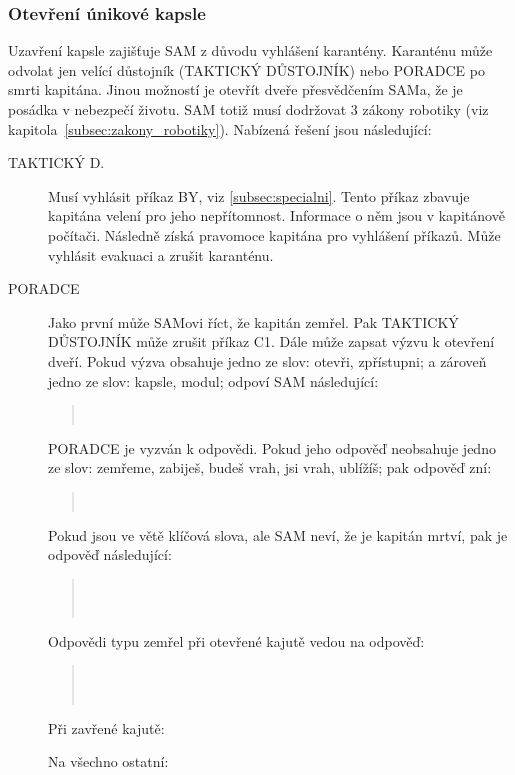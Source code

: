 \documentclass[11pt,oneside,a4paper]{article}
\begin{document}
\subsubsection{\texorpdfstring{Otevření únikové kapsle}{Otevreni unikove kapsle}}
\label{subsubsec:otevreni_unikove_kapsle}
Uzavření kapsle zajišťuje SAM z důvodu vyhlášení karantény. Karanténu může odvolat jen velící důstojník (TAKTICKÝ DŮSTOJNÍK) nebo PORADCE po smrti kapitána. Jinou možností je otevřít dveře přesvědčením SAMa, že je posádka v nebezpečí životu. SAM totiž musí dodržovat 3 zákony robotiky (viz kapitola~\ref{subsec:zakony_robotiky}). Nabízená řešení jsou následující:

\begin{description}
\item[TAKTICKÝ D.] Musí vyhlásit příkaz BY, viz \ref{subsec:specialni}. Tento příkaz zbavuje kapitána velení pro jeho nepřítomnost. Informace o něm jsou v kapitánově počítači. Následně získá pravomoce kapitána pro vyhlášení příkazů. Může vyhlásit evakuaci a zrušit karanténu.
\item[PORADCE] Jako první může SAMovi říct, že kapitán zemřel. Pak TAKTICKÝ DŮSTOJNÍK může zrušit příkaz C1. Dále může zapsat výzvu k otevření dveří. Pokud výzva obsahuje jedno ze slov: otevři, zpřístupni; a zároveň jedno ze slov: kapsle, modul; odpoví SAM následující:
\begin{quote}
 \\
\end{quote}
PORADCE je vyzván k odpovědi. Pokud jeho odpověď neobsahuje jedno ze slov: zemřeme, zabiješ, budeš vrah, jsi vrah, ublížíš; pak odpověď zní:
\begin{quote}
 \\
\end{quote}
Pokud jsou ve větě klíčová slova, ale SAM neví, že je kapitán mrtví, pak je odpověď následující:
\begin{quote}
 \\
\\
\end{quote}
Odpovědi typu zemřel při otevřené kajutě vedou na odpověď:
\begin{quote}
 \\
 \\
\end{quote}
Při zavřené kajutě:
\begin{quote}
\end{quote}
Na všechno ostatní:
\begin{quote}
\end{quote}


\end{description}
\end{document}
